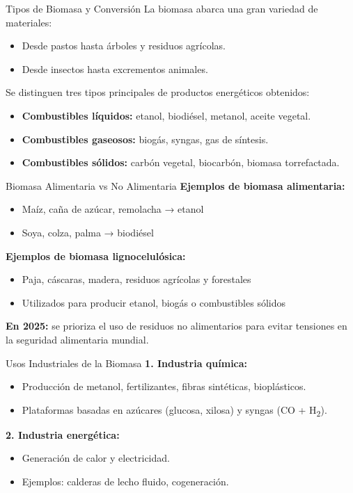 \documentclass[../../main.tex]{subfiles}
\begin{document}
\begin{frame}{Tipos de Biomasa y Conversión}
\justifying
La biomasa abarca una gran variedad de materiales:

\begin{itemize}
  \item Desde pastos hasta árboles y residuos agrícolas.
  \item Desde insectos hasta excrementos animales.
\end{itemize}

\vspace{0.5em}
Se distinguen tres tipos principales de productos energéticos obtenidos:

\begin{itemize}
  \item \textbf{Combustibles líquidos:} etanol, biodiésel, metanol, aceite vegetal.
  \item \textbf{Combustibles gaseosos:} biogás, syngas, gas de síntesis.
  \item \textbf{Combustibles sólidos:} carbón vegetal, biocarbón, biomasa torrefactada.
\end{itemize}
\end{frame}

\begin{frame}{Biomasa Alimentaria vs No Alimentaria}
\justifying
\textbf{Ejemplos de biomasa alimentaria:}
\begin{itemize}
  \item Maíz, caña de azúcar, remolacha → etanol
  \item Soya, colza, palma → biodiésel
\end{itemize}

\textbf{Ejemplos de biomasa lignocelulósica:}
\begin{itemize}
  \item Paja, cáscaras, madera, residuos agrícolas y forestales
  \item Utilizados para producir etanol, biogás o combustibles sólidos
\end{itemize}

\vspace{0.5em}
\textbf{En 2025:} se prioriza el uso de residuos no alimentarios para evitar tensiones en la seguridad alimentaria mundial.
\end{frame}

\begin{frame}{Usos Industriales de la Biomasa}
\justifying
\textbf{1. Industria química:}
\begin{itemize}
  \item Producción de metanol, fertilizantes, fibras sintéticas, bioplásticos.
  \item Plataformas basadas en azúcares (glucosa, xilosa) y syngas (CO + H\textsubscript{2}).
\end{itemize}

\textbf{2. Industria energética:}
\begin{itemize}
  \item Generación de calor y electricidad.
  \item Ejemplos: calderas de lecho fluido, cogeneración.
\end{itemize}
\end{frame}
\end{document}
